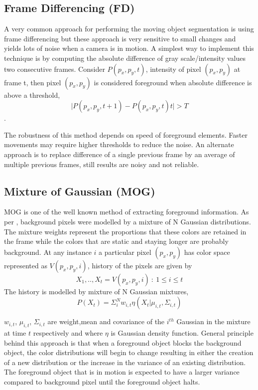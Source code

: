 \subsection{Frame Differencing (FD)}
A very common approach for performing the moving object segmentation is using frame differencing but these approach is very sensitive to small changes and yields lots of noise when a camera is in motion. A simplest way to implement this technique is by computing the absolute difference of gray scale/intensity values two consecutive frames. Consider $P(p_x,p_y,t)$, intensity of pixel $(p_x,p_y)$ at frame t, then pixel $(p_x,p_y)$ is considered foreground when absolute difference is above a threshold,$$\vert P(p_x,p_y,t+1) - P(p_x,p_y,t)t\vert > T$$.
\par The robustness of this method depends on speed of foreground elements. Faster movements may require higher thresholds to reduce the noise.  An alternate approach is to replace difference of a single previous frame  by an average of multiple previous frames, still results are noisy and not reliable.

\subsection{Mixture of Gaussian (MOG)}
MOG is one of the well known method of extracting foreground information. As per \cite{kaew}, background pixels were modelled by a mixture of N Gaussian distributions. The mixture weights represent the proportions that these colors are retained in the frame while the colors that are static and staying longer are probably background. At any instance $i$ a particular pixel $(p_x,p_y)$ has color space represented as $V(p_{x},p_{y},i)$, history of the pixels are given by 
$$X_{1},..,X_{t} = {V(p_{x},p_{y},i)~:~1\le i \le t }$$
The history is modelled by mixture of N Gaussian mixtures,
$$P(X_{t})=\Sigma_{i}^{N}w_{i,t}\eta(X_{t}|\mu_{i,t},\Sigma_{i,t})$$
\par $w_{i,t}$, $\mu_{i,t}$, $\Sigma_{i,t}$ are weight,mean and covariance of the $i^{th}$ Gaussian in the mixture at time $t$ respectively and where $\eta$ is Gaussian density function. General principle behind this approach is that when a foreground object blocks the background object, the color distributions will begin to change resulting in either the creation of a new distribution or the increase in the variance of an existing distribution. The foreground object that is in motion is expected to have a larger variance compared to background pixel until the foreground object halts.


